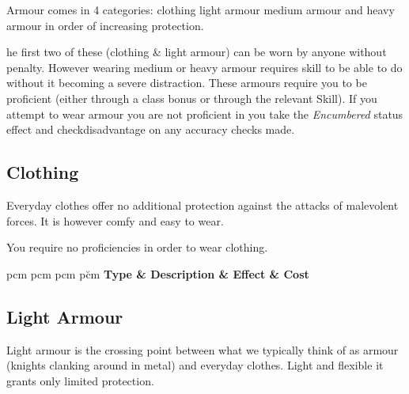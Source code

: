 Armour comes in 4 categories: clothing\comma{} light armour\comma{} medium armour and heavy armour\comma{} in order of increasing protection. 

he first two of these (clothing \& light armour) can be worn by anyone\comma{} without penalty. However\comma{} wearing medium or heavy armour requires skill to be able to do\comma{} without it becoming a severe distraction. These armours require you to be proficient (either through a class bonus\comma{} or through the relevant Skill). If you attempt to wear armour you are not proficient in\comma{} you take the {\it Encumbered} status effect and check\minus{}disadvantage on any accuracy checks made.

\newpage
\subsection{Clothing}

Everyday clothes offer no additional protection against the attacks of malevolent forces. It is\comma{} however\comma{} comfy and easy to wear. 

You require no proficiencies in order to wear clothing. 

\small
\begin{center}
\begin{rndtable}{p{\y cm} p{\w cm} p{\x cm} p{\u cm}}
\bf Type   &	\bf Description	&	\bf Effect	& \bf Cost


\end{rndtable}
\end{center}
\normalsize
\subsection{Light Armour}

Light armour is the crossing point between what we typically think of as armour (knights clanking around in metal)\comma{} and everyday clothes. Light and flexible\comma{} it grants only limited protection. 

